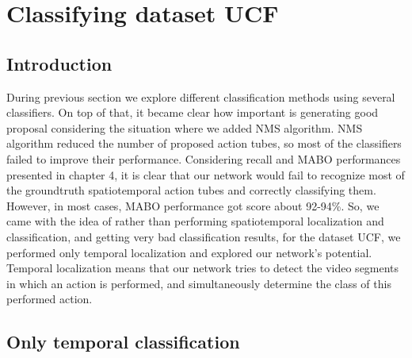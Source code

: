 \section{Classifying dataset UCF}
\subsection{Introduction}
During previous section we explore different classification methods using several classifiers. On top of that, it became clear how important is generating good proposal considering the situation
where we added NMS algorithm. NMS algorithm reduced the number of proposed action tubes, so most of the classifiers failed to improve their performance. Considering recall and MABO performances presented
in chapter 4, it is clear that our network would fail to recognize most of the groundtruth spatiotemporal action tubes and correctly classifying them. However, in most cases, MABO performance
got score about 92-94\%. So, we came with the idea of rather than performing spatiotemporal localization and classification, and getting very bad classification results, for the dataset UCF, we performed
only temporal localization and explored our network's potential. Temporal localization  means that  our network tries to detect the video segments in which an action is performed, and simultaneously
determine the class of this performed action.


\subsection{Only temporal classification}

